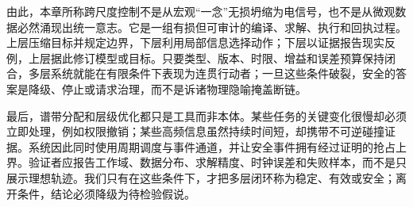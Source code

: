 由此，本章所称跨尺度控制不是从宏观“一念”无损坍缩为电信号，也不是从微观数据必然涌现出统一意志。它是一组有损但可审计的编译、求解、执行和回执过程。上层压缩目标并规定边界，下层利用局部信息选择动作；下层以证据报告现实反例，上层据此修订模型或目标。只要类型、版本、时限、增益和误差预算保持闭合，多层系统就能在有限条件下表现为连贯行动者；一旦这些条件破裂，安全的答案是降级、停止或请求治理，而不是诉诸物理隐喻掩盖断链。

最后，谱带分配和层级优化都只是工具而非本体。某些任务的关键变化很慢却必须立即处理，例如权限撤销；某些高频信息虽然持续时间短，却携带不可逆碰撞证据。系统因此同时使用周期调度与事件通道，并让安全事件拥有经过证明的抢占上界。验证者应报告工作域、数据分布、求解精度、时钟误差和失败样本，而不是只展示理想轨迹。我们只有在这些条件下，才把多层闭环称为稳定、有效或安全；离开条件，结论必须降级为待检验假说。

